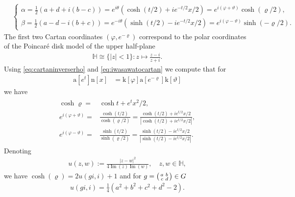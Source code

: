 \documentclass[12pt]{amsart}
\theoremstyle{definition}
\theoremstyle{remark}
\numberwithin{equation}{section}
\newcommand{\1}{{\mathbf 1}}
\renewcommand{\Im}{\operatorname{Im}}
\begin{document}
\begin{align} 
\label{eq:iwasawatocartan}  &\begin{cases} \alpha = \frac{1}{2}(a+d + i(b-c))=e^{i\theta}  (\cosh(t/2) + i e^{-t/2} x /2) = e^{i(\varphi + \vartheta)} \cosh(\varrho/2),  \\ \beta =\frac{1}{2}(a-d - i(b+c) ) =e^{-i\theta} (\sinh(t/2) - i e^{-t/2} x /2) =e^{i(\varphi - \vartheta)} \sinh(-\varrho/2) .\end{cases}
\end{align}
The first two Cartan coordinates $(\varphi,e^{-\varrho})$ correspond to the polar coordinates of the Poincar\'e disk model of the upper half-plane
\begin{align*}
    \mathbb{H} \cong \{ |z| < 1\}: z \mapsto \frac{z-i}{z+i}.
\end{align*}
Using \eqref{eq:cartaninverserho} and \eqref{eq:iwasawatocartan} we compute that for 
\begin{align*}
    \mathrm{a}[e^t] \mathrm{n}[x] &= \mathrm{k}[\varphi] \mathrm{a}[e^{-\varrho}] \mathrm{k}[\vartheta]
\end{align*}
we have
\begin{align} \label{eq:cartanAbel}
\begin{split}
\cosh \varrho = & \cosh t + e^{t} x^2  /2, \\ 
  e^{i (\varphi + \vartheta)} = & \frac{\cosh(t/2)}{\cosh(\varrho/2)} =\frac{\cosh(t/2) +i e^{t/2} x/2  }{|\cosh(t/2) +i e^{t/2} x/2 |},  \\
  e^{i (\varphi-\vartheta)} =& \frac{\sinh(t/2)}{\sinh(\varrho/2)} =    \frac{\sinh(t/2) -i e^{t/2} x/2  }{|\sinh(t/2) -i e^{t/2} x/2 |}.
  \end{split}
\end{align}
Denoting 
\begin{align*}
u(z,w):= \frac{|z-w|^2}{4 \Im(z) \Im(w)}, \quad z,w\in \mathbb{H},    
\end{align*}
 we have $\cosh(\varrho) = 2u(gi,i) +1$ and for $g= \smqty(a & b \\ c& d) \in G$
 \begin{align} \label{eq:ulowerbound}
   u(gi, i) = \tfrac{1}{4}  (a^2+b^2+c^2+d^2-2).
 \end{align}
\end{document}
